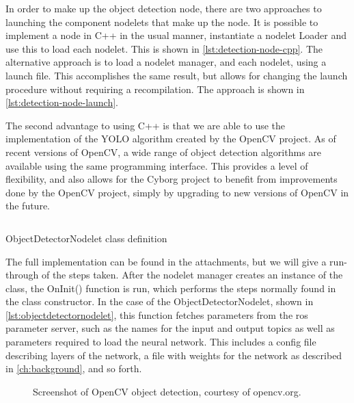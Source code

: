 \documentclass[\rootfolder/main.tex]{subfiles}
\begin{document}
In order to make up the object detection node, there are two approaches to launching the component nodelets that make up the node.
It is possible to implement a node in C++ in the usual manner, instantiate a nodelet Loader and use this to load each nodelet.
This is shown in \cref{lst:detection-node-cpp}.
The alternative approach is to load a nodelet manager, and each nodelet, using a launch file.
This accomplishes the same result, but allows for changing the launch procedure without requiring a recompilation.
The approach is shown in \cref{lst:detection-node-launch}.

The second advantage to using C++ is that we are able to use the implementation of the YOLO algorithm created by the OpenCV project.
As of recent versions of OpenCV, a wide range of object detection algorithms are available using the same programming interface.
This provides a level of flexibility, and also allows for the Cyborg project to benefit from improvements done by the OpenCV project, simply by upgrading to new versions of OpenCV in the future.

\begin{listing}
    \inputminted{cpp}{\rootfolder/Chapters/Chapter5/Listings/ObjectDetectorNodelet}
    \caption{ObjectDetectorNodelet class definition\label{lst:objectdetectornodelet}}
\end{listing}

The full implementation can be found in the attachments, but we will give a run-through of the steps taken.
After the nodelet manager creates an instance of the class, the OnInit() function is run, which performs the steps normally found in the class constructor.
In the case of the ObjectDetectorNodelet, shown in \cref{lst:objectdetectornodelet}, this function fetches parameters from the \acrshort{ros} parameter server, such as the names for the input and output topics as well as parameters required to load the neural network.
This includes a config file describing layers of the network, a file with weights for the network as described in \cref{ch:background}, and so forth.

\begin{figure}[ht]
    \caption[Screenshot of OpenCV object detection.]{Screenshot of OpenCV object detection, courtesy of opencv.org.\label{fig:opencv}}
\end{figure}
\end{document}
